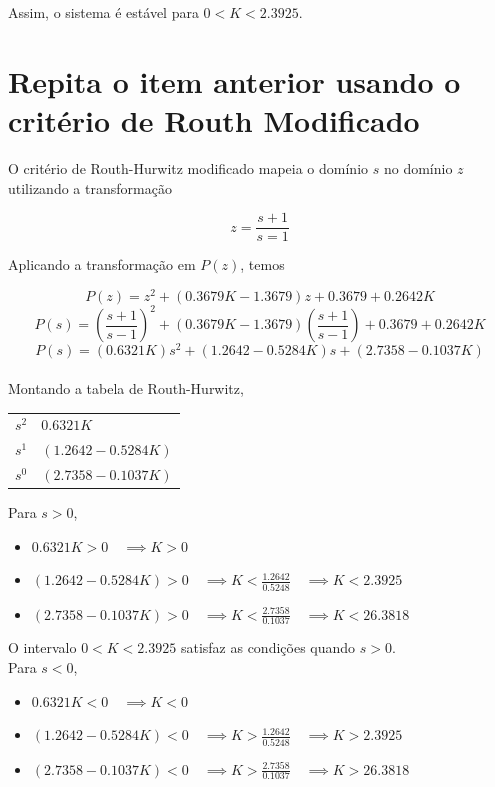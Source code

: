 \documentclass{article}
\begin{document}
    {Assim, o sistema é estável para $ 0 < K < 2.3925 $.}

\section{Repita o item anterior usando o critério de Routh Modificado}

    {O critério de Routh-Hurwitz modificado mapeia o domínio $s$ no domínio $z$
    utilizando a transformação}

    \[ z = \frac{s + 1}{s = 1} \]

    {Aplicando a transformação em $P(z)$, temos}

    \[ P(z) = z^2 + (0.3679K - 1.3679)z + 0.3679 + 0.2642K \]
    \[ P(s) = {\left(\frac{s + 1}{s - 1}\right)}^2 + (0.3679K - 1.3679)\left(\frac{s + 1}{s - 1}\right) + 0.3679 + 0.2642K \]
    \[ P(s) = (0.6321K)s^2 + (1.2642 - 0.5284K)s + (2.7358 - 0.1037K) \]\\

    {Montando a tabela de Routh-Hurwitz,}

    \begin{table}[H]
        \centering
        \begin{tabular}{ c | l }
            $s^2$ & $0.6321K$ \\
            $s^1$ & $(1.2642 - 0.5284K)$ \\
            $s^0$ & $(2.7358 - 0.1037K)$ \\
        \end{tabular}
    \end{table}

    {Para $s > 0$,}

    \begin{itemize}
        \item $ 0.6321K > 0 \quad \implies K > 0 $
        \item $(1.2642 - 0.5284K) > 0 \quad \implies K < \frac{1.2642}{0.5248} \quad \implies K < 2.3925 $
        \item $(2.7358 - 0.1037K) > 0 \quad \implies K < \frac{2.7358}{0.1037} \quad \implies K < 26.3818 $
    \end{itemize}

    {O intervalo $ 0 < K < 2.3925 $ satisfaz as condições quando $s > 0$.}\\

    {Para $s < 0$,}

    \begin{itemize}
        \item $ 0.6321K < 0 \quad \implies K < 0 $
        \item $(1.2642 - 0.5284K) < 0 \quad \implies K > \frac{1.2642}{0.5248} \quad \implies K > 2.3925 $
        \item $(2.7358 - 0.1037K) < 0 \quad \implies K > \frac{2.7358}{0.1037} \quad \implies K > 26.3818 $
    \end{itemize}
\end{document}
